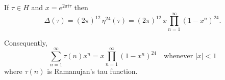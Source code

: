 If $\tau \in H$ and $x = e^{2\pi i\tau}$ then
$$\Delta(\tau) = (2\pi)^{12}\,\eta^{24}(\tau) = (2\pi)^{12}\,x\prod_{n=1}^{\infty}(1-x^n)^{24}.$$

Consequently,
$$\sum_{n=1}^{\infty}\tau(n)x^n = x\prod_{n=1}^{\infty}(1-x^n)^{24} \quad \text{whenever } |x| < 1$$
where $\tau(n)$ is Ramanujan's tau function.
